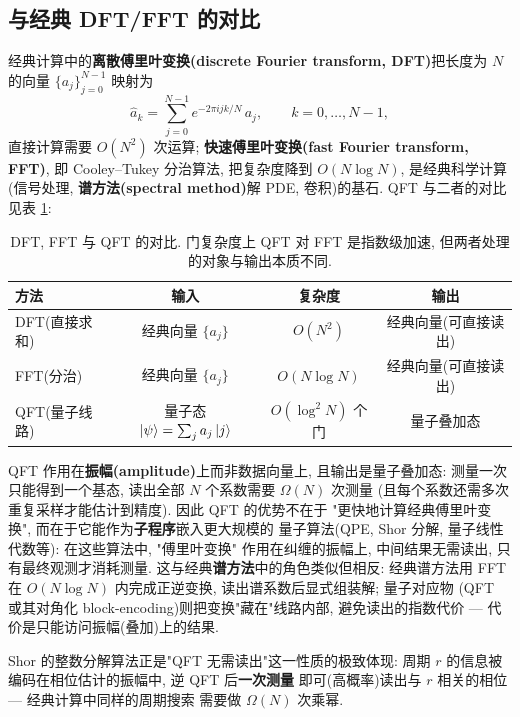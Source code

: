 \documentclass[utf8]{article} %
\numberwithin{equation}{section}   %
\newtheorem{Note}{\hskip 2em {\color{red} 注}}[subsection]
\begin{document}
\subsection{与经典 DFT/FFT 的对比}

经典计算中的\textbf{离散傅里叶变换(discrete Fourier transform, DFT)}把长度为 $N$
的向量 $\{a_j\}_{j=0}^{N-1}$ 映射为
\begin{equation}
    \hat{a}_k = \sum_{j=0}^{N-1} e^{-2\pi i jk/N}\, a_j, \qquad k = 0, \dots, N-1,
\end{equation}
直接计算需要 $O(N^2)$ 次运算; \textbf{快速傅里叶变换(fast Fourier transform, FFT)},
即 Cooley--Tukey 分治算法, 把复杂度降到 $O(N\log N)$, 是经典科学计算(信号处理, 
\textbf{谱方法(spectral method)}解 PDE, 卷积)的基石. QFT 与二者的对比见表 \ref{tab:ft}:

\begin{table}[H]
\centering
\begin{tabular}{lccc}
    \toprule
    方法 & 输入 & 复杂度 & 输出 \\
    \midrule
    DFT(直接求和) & 经典向量 $\{a_j\}$ & $O(N^2)$ & 经典向量(可直接读出) \\
    FFT(分治) & 经典向量 $\{a_j\}$ & $O(N\log N)$ & 经典向量(可直接读出) \\
    QFT(量子线路) & 量子态 $\ket{\psi}=\sum_j a_j\ket{j}$ & $O(\log^2 N)$ 个门 & 量子叠加态 \\
    \bottomrule
\end{tabular}
\caption{DFT, FFT 与 QFT 的对比. 门复杂度上 QFT 对 FFT 是指数级加速, 
但两者处理的对象与输出本质不同.}
\label{tab:ft}
\end{table}

\begin{Note}
    QFT 作用在\textbf{振幅(amplitude)}上而非数据向量上, 且输出是量子叠加态:
    测量一次只能得到一个基态, 读出全部 $N$ 个系数需要 $\Omega(N)$ 次测量
    (且每个系数还需多次重复采样才能估计到精度). 因此 QFT 的优势不在于
    "更快地计算经典傅里叶变换", 而在于它能作为\textbf{子程序}嵌入更大规模的
    量子算法(QPE, Shor 分解, 量子线性代数等): 在这些算法中, "傅里叶变换"
    作用在纠缠的振幅上, 中间结果无需读出, 只有最终观测才消耗测量.
    这与经典\textbf{谱方法}中的角色类似但相反: 经典谱方法用 FFT 在
    $O(N\log N)$ 内完成正逆变换, 读出谱系数后显式组装解; 量子对应物
    (QFT 或其对角化 block-encoding)则把变换"藏在"线路内部, 
    避免读出的指数代价 --- 代价是只能访问振幅(叠加)上的结果.
\end{Note}

\begin{Note}
    Shor 的整数分解算法正是"QFT 无需读出"这一性质的极致体现:
    周期 $r$ 的信息被编码在相位估计的振幅中, 逆 QFT 后\textbf{一次测量}
    即可(高概率)读出与 $r$ 相关的相位 --- 经典计算中同样的周期搜索
    需要做 $\Omega(N)$ 次乘幂.
\end{Note}
\end{document}
